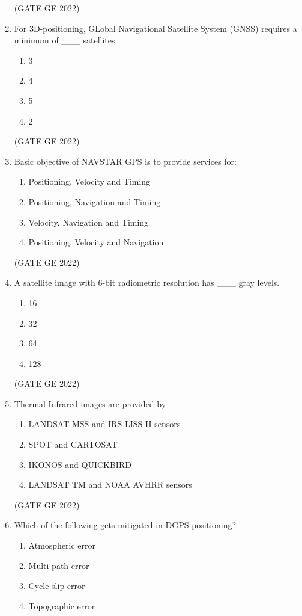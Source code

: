 \documentclass[journal,12pt,onecolumn]{IEEEtran}
\theoremstyle{remark}
\begin{document}
\begin{enumerate}
\hfill (GATE GE 2022)

\item For 3D-positioning, GLobal Navigational Satellite System (GNSS) requires a minimum of \_\_\_ satellites.
\begin{enumerate}
    \item 3
    \item 4
    \item 5
    \item 2
\end{enumerate}

\hfill (GATE GE 2022)

\item Basic objective of NAVSTAR GPS is to provide services for:
\begin{enumerate}
    \item Positioning, Velocity and Timing
    \item Positioning, Navigation and Timing
    \item Velocity, Navigation and Timing
    \item Positioning, Velocity and Navigation
\end{enumerate}

\hfill (GATE GE 2022)

\item A satellite image with 6-bit radiometric resolution has \_\_\_ gray levels.
\begin{enumerate}
    \item 16
    \item 32
    \item 64
    \item 128
\end{enumerate}

\hfill (GATE GE 2022)

\item Thermal Infrared images are provided by
\begin{enumerate}
    \item LANDSAT MSS and IRS LISS-II sensors
    \item SPOT and CARTOSAT
    \item IKONOS and QUICKBIRD
    \item LANDSAT TM and NOAA AVHRR sensors
\end{enumerate}

\hfill (GATE GE 2022)

\item Which of the following gets mitigated in DGPS positioning?
\begin{enumerate}
    \item Atmospheric error
    \item Multi-path error
    \item Cycle-slip error
    \item Topographic error
\end{enumerate}


\end{enumerate}
\end{document}
